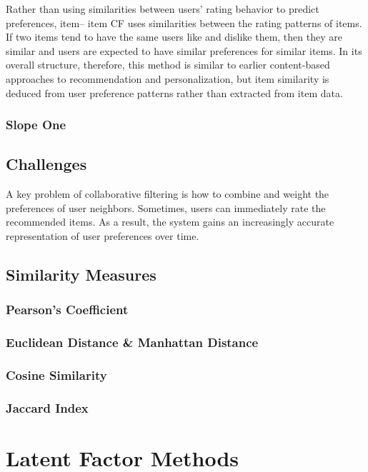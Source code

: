 \cite{schafer2007collaborative}

 Rather than using
similarities between users’ rating behavior to predict preferences, item–
item CF uses similarities between the rating patterns of items. If two
items tend to have the same users like and dislike them, then they are
similar and users are expected to have similar preferences for similar
items. In its overall structure, therefore, this method is similar to earlier
content-based approaches to recommendation and personalization, but
item similarity is deduced from user preference patterns rather than
extracted from item data.


\subsubsection{Slope One}

\subsection{Challenges}
A key problem of collaborative filtering is how to combine and weight the preferences of user neighbors. Sometimes, users can immediately rate the recommended items. As a result, the system gains an increasingly accurate representation of user preferences over time.

\subsection{Similarity Measures}
\subsubsection{Pearson's Coefficient}
\subsubsection{Euclidean Distance \& Manhattan Distance}
\subsubsection{Cosine Similarity}
\subsubsection{Jaccard Index}

\section{Latent Factor Methods}

